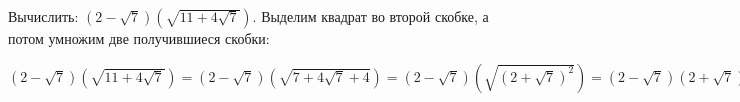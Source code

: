  Вычислить: $(2-\sqrt{7})(\sqrt{11+4\sqrt{7}}).$
\Solution Выделим квадрат во второй скобке, а потом умножим две получившиеся скобки:
\begin{center}
$(2-\sqrt{7})(\sqrt{11+4\sqrt{7}})=(2-\sqrt{7})(\sqrt{7+4\sqrt{7}+4})=(2-\sqrt{7})\left(\sqrt{(2+\sqrt{7})^2}\right)=(2-\sqrt{7})(2+\sqrt{7})=4-7=-3.$
\end{center}

